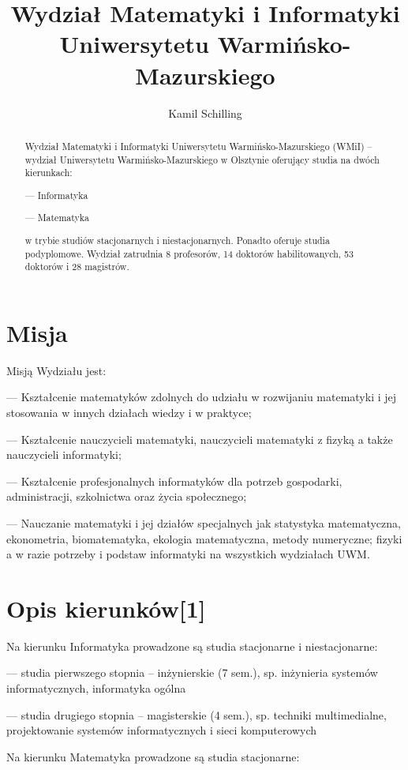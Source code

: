 \documentclass[a4paper,12pt]{article}
\title{Wydział Matematyki i Informatyki Uniwersytetu
Warmińsko-Mazurskiego}
\author{Kamil Schilling}
\begin{document}
\maketitle

\begin{abstract}
Wydział Matematyki i Informatyki Uniwersytetu Warmińsko-Mazurskiego (WMiI) – wydział
Uniwersytetu Warmińsko-Mazurskiego w Olsztynie oferujący studia na dwóch kierunkach:

--- Informatyka

--- Matematyka

w trybie studiów stacjonarnych i niestacjonarnych. Ponadto oferuje studia podyplomowe.
Wydział zatrudnia 8 profesorów, 14 doktorów habilitowanych, 53 doktorów i 28 magistrów.
\end{abstract}

\section{Misja}
Misją Wydziału jest:

--- Kształcenie matematyków zdolnych do udziału w rozwijaniu matematyki i jej stosowania w innych
działach wiedzy i w praktyce;

--- Kształcenie nauczycieli matematyki, nauczycieli matematyki z fizyką a także nauczycieli informatyki;

--- Kształcenie profesjonalnych informatyków dla potrzeb gospodarki, administracji, szkolnictwa oraz życia
społecznego;

--- Nauczanie matematyki i jej działów specjalnych jak statystyka matematyczna, ekonometria,
biomatematyka, ekologia matematyczna, metody numeryczne; fizyki a w razie potrzeby i podstaw
informatyki na wszystkich wydziałach UWM.

\section{Opis kierunków[1]}

Na kierunku Informatyka prowadzone są studia stacjonarne i niestacjonarne:

--- studia pierwszego stopnia – inżynierskie (7 sem.), sp. inżynieria systemów informatycznych, informatyka
ogólna

--- studia drugiego stopnia – magisterskie (4 sem.), sp. techniki multimedialne, projektowanie systemów
informatycznych i sieci komputerowych

Na kierunku Matematyka prowadzone są studia stacjonarne:
\end{document}
